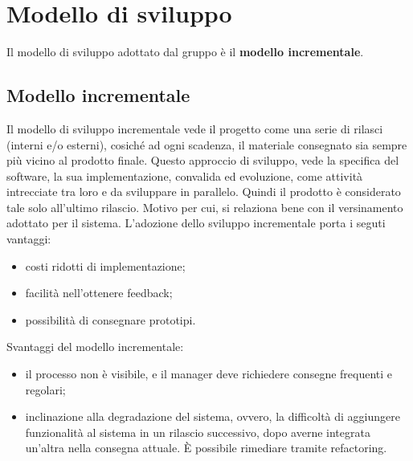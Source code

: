 \section{Modello di sviluppo}
Il modello di sviluppo adottato dal gruppo è il \textbf{modello incrementale}.
\subsection{Modello incrementale}
Il modello di sviluppo incrementale vede il progetto come una serie di rilasci (interni e/o esterni), cosiché ad ogni scadenza, il materiale consegnato sia sempre più vicino al prodotto finale.
Questo approccio di sviluppo, vede la specifica del software, la sua implementazione, convalida ed evoluzione, come attività intrecciate tra loro e da sviluppare in parallelo. Quindi il prodotto è considerato tale solo all'ultimo rilascio. Motivo per cui, si relaziona bene con il versinamento adottato per il sistema.
L'adozione dello sviluppo incrementale porta i seguti vantaggi:
\begin{itemize}
\item costi ridotti di implementazione;
\item facilità nell'ottenere feedback;
\item possibilità di consegnare prototipi.
\end{itemize}
Svantaggi del modello incrementale:
\begin{itemize}
\item il processo non è visibile, e il manager deve richiedere consegne frequenti e regolari;
\item inclinazione alla degradazione del sistema, ovvero, la difficoltà di aggiungere funzionalità al sistema in un rilascio successivo, dopo averne integrata un'altra nella consegna attuale. È possibile rimediare tramite refactoring.
\end{itemize}
